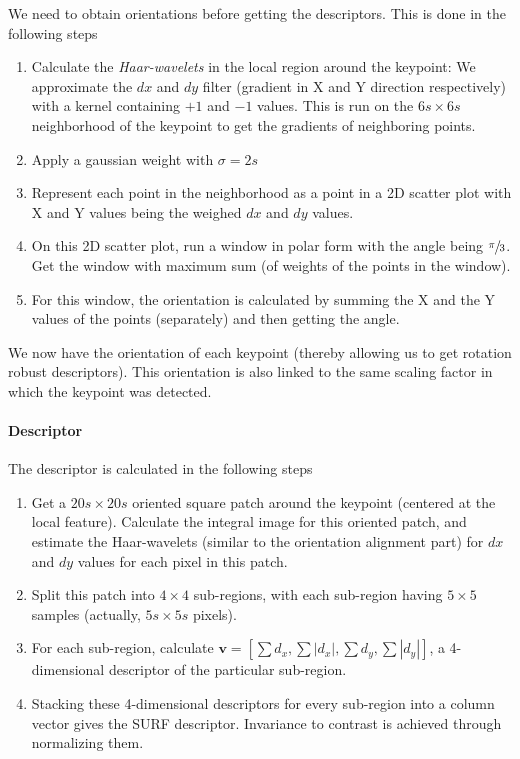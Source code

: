 We need to obtain orientations before getting the descriptors. This is done in the following steps

\begin{enumerate}
    \item Calculate the \emph{Haar-wavelets} in the local region around the keypoint: We approximate the $dx$ and $dy$ filter (gradient in X and Y direction respectively) with a kernel containing $+1$ and $-1$ values. This is run on the $6s \times 6s$ neighborhood of the keypoint to get the gradients of neighboring points.

    \item Apply a gaussian weight with $\sigma=2s$
    
    \item Represent each point in the neighborhood as a point in a 2D scatter plot with X and Y values being the weighed $dx$ and $dy$ values.
    
    \item On this 2D scatter plot, run a window in polar form with the angle being $\sfrac{\pi}{3}$. Get the window with maximum sum (of weights of the points in the window).
    
    \item For this window, the orientation is calculated by summing the X and the Y values of the points (separately) and then getting the angle.
\end{enumerate}

We now have the orientation of each keypoint (thereby allowing us to get rotation robust descriptors). This orientation is also linked to the same scaling factor in which the keypoint was detected.

\paragraph*{Descriptor}

The descriptor is calculated in the following steps

\begin{enumerate}
    \item Get a $20s \times 20s$ oriented square patch around the keypoint (centered at the local feature). Calculate the integral image for this oriented patch, and estimate the Haar-wavelets (similar to the orientation alignment part) for $dx$ and $dy$ values for each pixel in this patch.

    \item Split this patch into $4\times 4$ sub-regions, with each sub-region having $5\times 5$ samples (actually, $5s\times 5s$ pixels).
    
    \item For each sub-region, calculate $\mathbf{v} = \left[\sum d_x, \sum \left | d_x \right |, \sum d_y, \sum \left | d_y \right | \right]$, a 4-dimensional descriptor of the particular sub-region.
    
    \item Stacking these 4-dimensional descriptors for every sub-region into a column vector gives the SURF descriptor. Invariance to contrast is achieved through normalizing them.
\end{enumerate}

